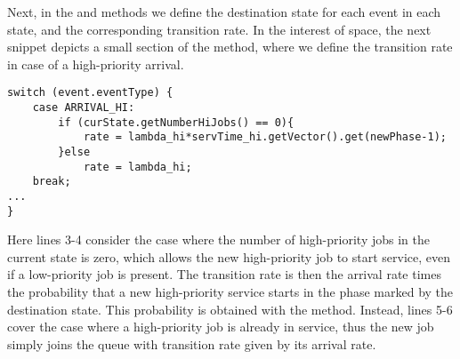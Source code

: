 Next, in the \Dests and \Rate methods we define the destination state for each
event in each state, and the corresponding transition rate. In the interest of
space, the next snippet depicts a small section of the \Rate method, where we
define the transition rate in case of a high-priority arrival.
\begin{lstlisting}
switch (event.eventType) {
	case ARRIVAL_HI:
		if (curState.getNumberHiJobs() == 0){
			rate = lambda_hi*servTime_hi.getVector().get(newPhase-1);
		}else
			rate = lambda_hi;
	break;
...
}
\end{lstlisting}
Here lines 3-4 consider the case where the number of high-priority jobs in the
current state is zero, which allows the new high-priority job to start service,
even if a low-priority job is present. The transition rate is then the arrival
rate times the probability that a new high-priority service starts in the phase
marked by the destination state. This probability is obtained with the \jPhase
{} method. Instead, lines 5-6 cover the case where a
high-priority job is already in service, thus the new job simply joins the
queue with transition rate given by its arrival rate.

